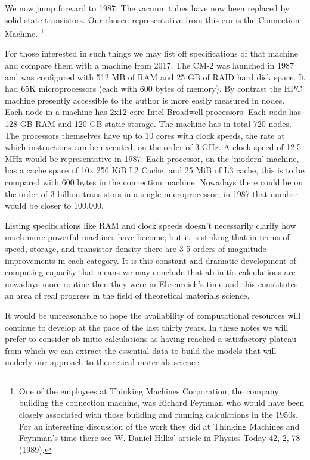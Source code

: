 We now jump forward to 1987. The vacuum tubes have
now been replaced by solid state transistors. Our chosen 
representative from this era is the Connection Machine.
\footnote{One of the employees at Thinking Machines Corporation,
the company building the connection machine, was Richard Feynman
who would have been closely associated with those building and running
calculations in the 1950s. For an interesting discussion of the work they
did at Thinking Machines and Feynman's time there see W. Daniel
Hillis' article in Physics Today 42, 2, 78 (1989).}

For those interested in such things we may list off specifications of 
that machine and compare them with a machine from 2017. The 
CM-2 was launched in 1987 and was configured with 512 MB of RAM and 25 GB of RAID
hard disk space. It had 65K microprocessors (each with 600 bytes of memory). 
By contrast the HPC machine presently accessible to the author 
is more easily measured in nodes. Each node in a machine has 2x12 core Intel Broadwell processors.
Each {\emph node} has 128 GB RAM and 120 GB static storage. The machine has in total 720 nodes. 
The processors themselves have up to 10 cores with clock speeds, the rate at which 
instructions can be executed, on the order of 3 GHz. A clock speed of 12.5 MHz 
would be representative in 1987. 
Each processor, on the `modern' machine, has a cache 
space of 10x 256 KiB L2 Cache, and 25 MiB of L3 cache,
this is to be compared with 600 bytes in the connection machine. 
Nowadays there could be on the order of 3 billion transistors in a 
single microprocessor; in 1987 that number would be closer to 100,000. 

Listing specifications like RAM and clock speeds doesn't necessarily clarify 
how much more powerful machines have become, 
but it is striking that in terms of speed, storage, and transistor density 
there are 3-5 orders of magnitude improvements in each category. 
It is this constant and dramatic development of computing capacity that 
means we may conclude that {ab initio} 
calculations are nowadays more routine then they were in Ehrenreich's time
and this constitutes an area of real progress in the field of theoretical
materials science. 

It would be unreasonable to hope 
the availability of computational resources will continue to develop
at the pace of the last thirty years. In these notes we will prefer to
consider ab initio calculations as having reached a satisfactory
plateau from which we can extract the essential data to build
the models that will underly our approach to theoretical
materials science.

